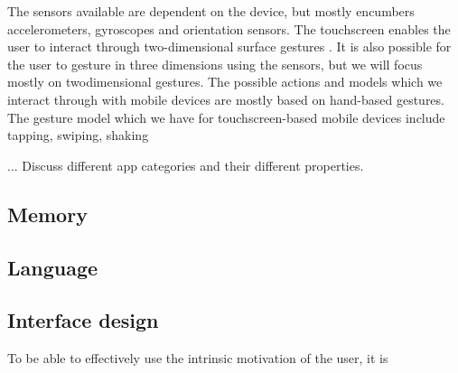 {The sensors available are dependent on the device, but mostly encumbers accelerometers, gyroscopes and orientation sensors. The touchscreen enables the user to interact through two-dimensional surface gestures \cite{Ruiz2011}. It is also possible for the user to gesture in three dimensions using the sensors, but we will focus mostly on twodimensional gestures. The possible actions and models which we interact through with mobile devices are mostly based on hand-based gestures. The gesture model which we have for touchscreen-based mobile devices include tapping, swiping, shaking

... Discuss different app categories and their different properties.

\subsection{Memory}
\subsection{Language}
\subsection{Interface design}
To be able to effectively use the intrinsic motivation of the user, it is
}
